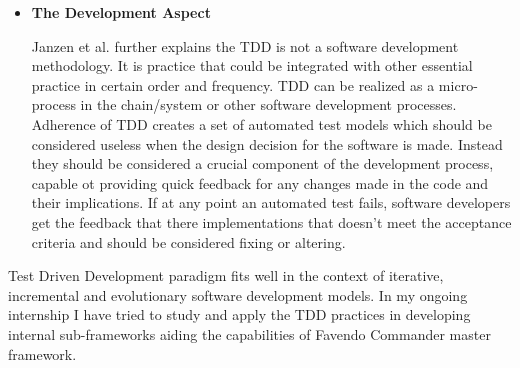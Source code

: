 \begin{itemize}
	\item \textbf{The Development Aspect}
	\par Janzen et al. \cite{janzen2005test} further explains the TDD is not a software development methodology. It is practice that could be integrated with other essential practice in certain order and frequency. TDD can be realized as a micro-process in the chain/system or other software development processes. Adherence of TDD creates a set of automated test models which should be considered useless when the design decision for the software is made. Instead they should be considered a crucial component of the development process, capable ot providing quick feedback for any changes made in the code and their implications. If at any point an automated test fails, software developers get the feedback that there implementations that doesn't meet the acceptance criteria and should be considered fixing or altering.
\end{itemize}
Test Driven Development paradigm fits well in the context of iterative, incremental and evolutionary software development models. In my ongoing internship I have tried to study and apply the TDD practices in developing internal sub-frameworks aiding the capabilities of Favendo Commander master framework.

